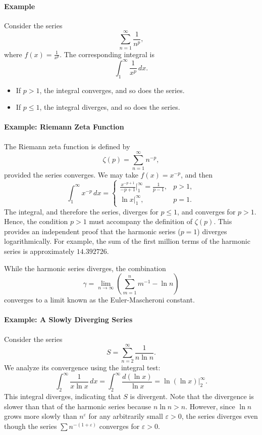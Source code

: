 \documentclass[12pt]{article}
\begin{document}
\paragraph{Example}
Consider the series 
\[
\sum_{n=1}^\infty \frac{1}{n^p},
\]
where \(f(x) = \frac{1}{x^p}\). The corresponding integral is
\[
\int_1^\infty \frac{1}{x^p} \, dx.
\]
\begin{itemize}
    \item If \(p > 1\), the integral converges, and so does the series.
    \item If \(p \leq 1\), the integral diverges, and so does the series.
\end{itemize}

\paragraph{Example: Riemann Zeta Function}
The Riemann zeta function is defined by
\[
\zeta(p) = \sum_{n=1}^\infty n^{-p},
\]
provided the series converges. We may take \(f(x) = x^{-p}\), and then
\[
\int_1^\infty x^{-p} \, dx = 
\begin{cases} 
\frac{x^{-p+1}}{-p+1} \bigg|_1^\infty = \frac{1}{p-1}, & p > 1, \\
\ln x \bigg|_1^\infty, & p = 1.
\end{cases}
\]
The integral, and therefore the series, diverges for \(p \leq 1\), and converges for \(p > 1\). Hence, the condition \(p > 1\) must accompany the definition of \(\zeta(p)\). This provides an independent proof that the harmonic series (\(p = 1\)) diverges logarithmically. For example, the sum of the first million terms of the harmonic series is approximately \(14.392726\).

While the harmonic series diverges, the combination
\[
\gamma = \lim_{n \to \infty} \left( \sum_{m=1}^n m^{-1} - \ln n \right)
\]
converges to a limit known as the Euler-Mascheroni constant.

\paragraph{Example: A Slowly Diverging Series}
Consider the series
\[
S = \sum_{n=2}^\infty \frac{1}{n \ln n}.
\]
We analyze its convergence using the integral test:
\[
\int_2^\infty \frac{1}{x \ln x} \, dx = \int_2^\infty \frac{d(\ln x)}{\ln x} = \ln(\ln x) \bigg|_2^\infty.
\]
This integral diverges, indicating that \(S\) is divergent. Note that the divergence is slower than that of the harmonic series because \(n \ln n > n\). However, since \(\ln n\) grows more slowly than \(n^\varepsilon\) for any arbitrarily small \(\varepsilon > 0\), the series diverges even though the series \(\sum n^{-(1+\varepsilon)}\) converges for \(\varepsilon > 0\).
\end{document}
